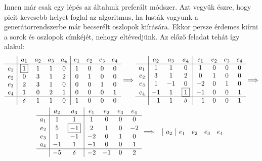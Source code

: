 \documentclass[a4paper, showtrims]{memoir}
\theoremstyle{plain}
\theoremstyle{remark}
\theoremstyle{definition}
\begin{document}
Innen már csak egy lépés az általunk preferált módszer.
Azt vegyük észre, hogy picit kevesebb helyet foglal az algoritmus, 
ha lusták vagyunk a generátorrendszerbe már becserélt oszlopok kiírására.
Ekkor persze érdemes kiírni a sorok és oszlopok címkéjét, nehogy eltévedjünk.
Az előző feladat tehát így alakul:
\begin{multline*}
	\begin{array}{r|cccc|cccc}
		    & a_1       & a_2 & a_3 & a_4 & e_1 & e_2 & e_3 & e_4 \\
		\hline
		e_1 & \boxed{1} & 1   & 1   & 0   & 1   & 0   & 0   & 0   \\
		e_2 & 0         & 3   & 1   & 2   & 0   & 1   & 0   & 0   \\
		e_3 & 2         & 3   & 1   & 0   & 0   & 0   & 1   & 0   \\
		e_4 & 1         & 0   & 2   & 1   & 0   & 0   & 0   & 1   \\
		\hline
		    & \delta    & 1   & 1   & 0   & 1   & 0   & 0   & 0
	\end{array}\Longrightarrow
	\begin{array}{r|ccc|cccc}
		    & a_2 & a_3 & a_4       & e_1 & e_2 & e_3 & e_4 \\
		\hline
		a_1 & 1   & 1   & 0         & 1   & 0   & 0   & 0   \\
		e_2 & 3   & 1   & 2         & 0   & 1   & 0   & 0   \\
		e_3 & 1   & -1  & 0         & -2  & 0   & 1   & 0   \\
		e_4 & -1  & 1   & \boxed{1} & -1  & 0   & 0   & 1   \\
		\hline
		    & -1  & 1   & \delta    & -1  & 0   & 0   & 1
	\end{array}\Longrightarrow
	\\
	\begin{array}{r|cc|cccc}
		    & a_2 & a_3        & e_1 & e_2 & e_3 & e_4 \\
		\hline
		a_1 & 1   & 1          & 1   & 0   & 0   & 0   \\
		e_2 & 5   & \boxed{-1} & 2   & 1   & 0   & -2  \\
		e_3 & 1   & -1         & -2  & 0   & 1   & 0   \\
		a_4 & -1  & 1          & -1  & 0   & 0   & 1   \\
		\hline
		    & -5  & \delta     & -2  & -1  & 0   & 2
	\end{array}\Longrightarrow
	\begin{array}{r|c|cccc}
		    & a_2        & e_1 & e_2         & e_3          & e_4          \\

\end{array}
\end{multline*}
\end{document}
